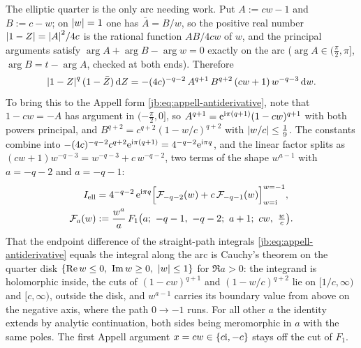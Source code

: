 The elliptic quarter is the only arc needing work.
Put $A := c w - 1$ and $B := c - w$; on ${|w|} = 1$ one has $\bar A = B / w$, so the positive
real number ${|1 - Z|} = {|A|}^2 / 4c$ is the rational function $A B / 4 c w$ of $w$, and the
principal arguments satisfy $\arg A + \arg B - \arg w = 0$ exactly on the arc ($\arg A \in
(\tfrac{\pi}{2}, \pi]$, $\arg B = t - \arg A$, checked at both ends).
Therefore
\begin{equation}
  \label{jb:eq:closure-ellipse-integrand}
  {|1 - Z|}^{q} \, (1 - \bar Z) \, \mathrm{d} Z
    = - (4 c)^{-q - 2} \, A^{q + 1} \, B^{q + 2} \, (c w + 1) \, w^{-q - 3} \, \mathrm{d} w .
\end{equation}
To bring this to the Appell form \eqref{jb:eq:appell-antiderivative}, note that $1 - c w = - A$ has
argument in $(- \tfrac{\pi}{2}, 0]$, so $A^{q + 1} = \mathrm{e}^{\mathrm{i} \pi (q + 1)} (1 - c w)^{q + 1}$ with
both powers principal, and $B^{q + 2} = c^{q + 2} (1 - w / c)^{q + 2}$ with ${|w / c|} \le
\tfrac19$.
The constants combine into $- (4 c)^{-q - 2} c^{q + 2} \mathrm{e}^{\mathrm{i} \pi (q + 1)} = 4^{-q - 2} \mathrm{e}^{\mathrm{i} \pi q}$,
and the linear factor splits as $(c w + 1) w^{-q - 3} = w^{-q - 3} + c \, w^{-q - 2}$, two terms of
the shape $w^{a - 1}$ with $a = -q - 2$ and $a = -q - 1$:
\begin{equation}
  \label{jb:eq:closure-ellipse}
  \begin{aligned}
    I_{\text{ell}}
      &
      = 4^{-q - 2} \, \e^{\I \pi q}
        \Bigl[ \mc F_{-q - 2}(w) + c \, \mc F_{-q - 1}(w) \Bigr]_{w = \I}^{w = -1},
    \\
    \mc F_a(w)
      &
      := \frac{w^a}{a} \, F_1 \bigl( a; \ - q - 1, \ - q - 2; \ a + 1; \ c w, \ \tfrac{w}{c} \bigr) .
  \end{aligned}
\end{equation}
That the endpoint difference of the straight-path integrals \eqref{jb:eq:appell-antiderivative}
equals the integral along the arc is Cauchy's theorem on the quarter disk $\{ \operatorname{Re} w \le 0, \
\operatorname{Im} w \ge 0, \ {|w|} \le 1 \}$ for $\Re a > 0$: the integrand is holomorphic inside, the cuts of
$(1 - c w)^{q + 1}$ and $(1 - w / c)^{q + 2}$ lie on $[1/c, \infty)$ and $[c, \infty)$, outside the
disk, and $w^{a - 1}$ carries its boundary value from above on the negative axis, where the path
$0 \to -1$ runs.
For all other $a$ the identity extends by analytic continuation, both sides being meromorphic in
$a$ with the same poles.
The first Appell argument $x = c w \in \{ c \mathrm{i}, - c \}$ stays off the cut of $F_1$.

